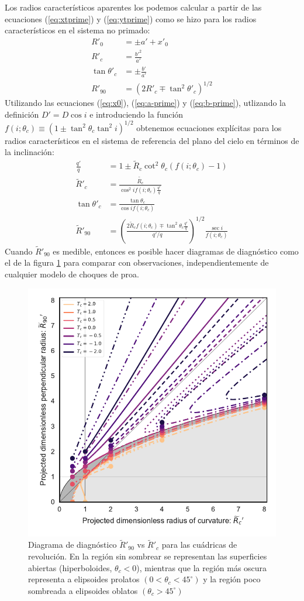 Los radios característicos aparentes los podemos calcular a partir de las ecuaciones (\ref{eq:xtprime}) y (\ref{eq:ytprime}) como se hizo para los radios característicos en el sistema no primado:
\begin{align}
  R'_0 &= \pm a' + x'_0\\
  R'_c &= \frac{b'^2}{a'}\\
  \tan\theta'_c &= \pm\frac{b'}{a'} \\
  R'_{90} &= \left(2R'_c \mp \tan^2\theta'_c\right)^{1/2}
\end{align}
Utilizando las ecuaciones (\ref{eq:x0}), (\ref{eq:a-prime}) y (\ref{eq:b-prime}), utlizando la definición $D' = D\cos i$ e introduciendo la función $f(i;\theta_c)\equiv \left(1 \pm \tan^2\theta_c\tan^2i\right)^{1/2}$ obtenemos ecuaciones explícitas para los radios característicos en el sistema de referencia del plano del cielo en términos de la inclinación:
\begin{align}
  \frac{q'}{q} &= 1 \pm \tilde{R}_c\cot^2\theta_c\left(f(i;\theta_c) - 1\right) \\
  \tilde{R}'_c &= \frac{\tilde{R_c}}{\cos^2if(i;\theta_c)\frac{q'}{q}} \label{eq:Rpc-quad}\\
  \tan\theta'_c &= \frac{\tan\theta_c}{\cos if(i;\theta_c)} \label{eq:thcp-quad}\\
  \tilde{R}'_{90} &= \left(\frac{2\tilde{R}_cf(i;\theta_c) \mp
                    \tan^2\theta_c\frac{q'}{q}}{q'/q}\right)^{1/2}\frac{\sec i}{f(i;\theta_c)}
  \label{eq:Rp90-quad}
\end{align}
Cuando $\tilde{R}'_{90}$ es medible, entonces es posible hacer diagramas de diagnóstico como
el de la figura \ref{fig:diagnostic} para comparar con observaciones, independientemente de cualquier modelo de choques de proa.
\begin{figure}
  \includegraphics[width=0.5\linewidth]{./Figures/projected-R90-vs-Rc}
  \caption{Diagrama de diagnóstico $\tilde{R}'_{90}$ vs $\tilde{R}'_c$ para las cuádricas de revolución. En la región sin sombrear se representan las superficies abiertas (hiperboloides, $\theta_c <0$), mientras que la región más oscura representa a elipsoides prolatos  $(0 < \theta_c < 45^\circ)$ y la región poco sombreada a elipsoides oblatos $(\theta_c > 45^\circ)$}
  \label{fig:diagnostic}
\end{figure}
